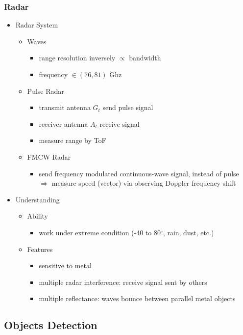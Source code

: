\subsubsection{Radar}
\begin{itemize}
\item Radar System
	\begin{itemize}
	\item Waves
		\begin{itemize}
		\item range resolution inversely $\propto$ bandwidth
		\item frequency $\in (76, 81)$ Ghz
		\end{itemize}
	\item Pulse Radar
		\begin{itemize}
		\item transmit antenna $G_t$ send pulse signal
		\item receiver antenna $A_t$ receive signal
		\item measure range by ToF
		\end{itemize}
	\item FMCW Radar
		\begin{itemize}
		\item send frequency modulated continuous-wave signal, instead of pulse \\
		$\Rightarrow$ measure speed (vector) via observing Doppler frequency shift
		\end{itemize}
	\end{itemize}
\item Understanding
	\begin{itemize}
	\item Ability
		\begin{itemize}
		\item work under extreme condition (-40 to 80$^{\circ}$, rain, dust, etc.)
		\end{itemize}
	\item Features
		\begin{itemize}
		\item sensitive to metal
		\item multiple radar interference: receive signal sent by others
		\item multiple reflectance: waves bounce between parallel metal objects
		\end{itemize}
	\end{itemize}
\end{itemize}

\subsection{Objects Detection} \label{DL_CV_Objdet}
